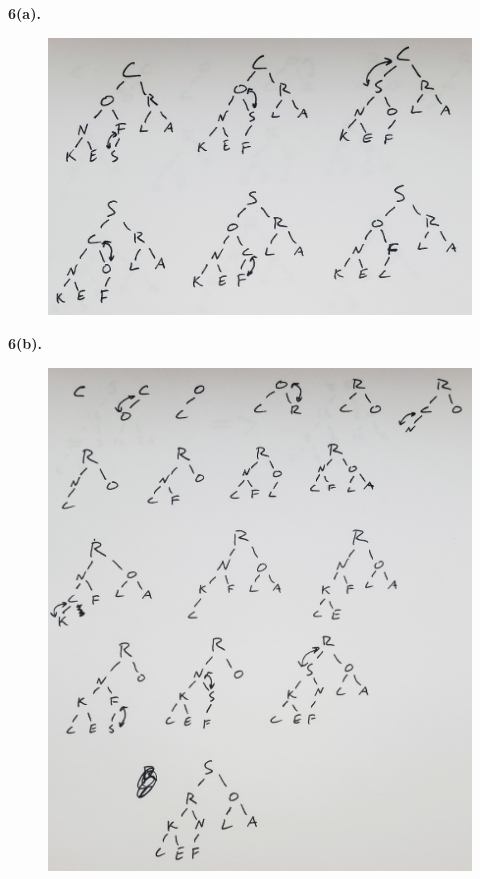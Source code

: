 \documentclass[letterpaper, 11pt]{article}
\newcommand{\hwnumber}[1]{\newpage \noindent\textbf{#1.} \smallskip}
\begin{document}
\hwnumber{6(a)}
\begin{figure}[h!]
  \centering
  \includegraphics[width=\linewidth]{pics/num_6.jpg}
\end{figure}

\hwnumber{6(b)}
\begin{figure}[h!]
  \centering
  \includegraphics[width=\linewidth]{pics/num_6_b.jpg}
\end{figure}
\end{document}
